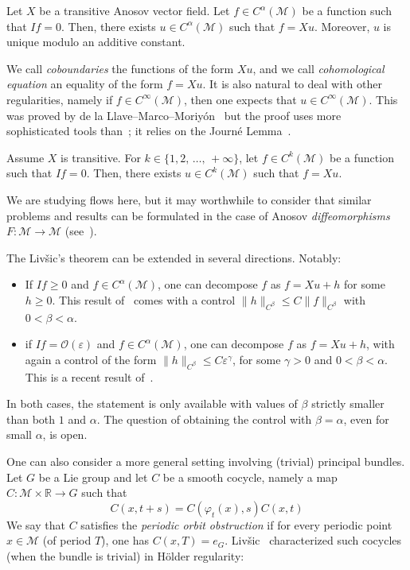 \documentclass[AHL,Unicode,longabstracts,published]{cedram}
\newcommand{\R}{\mathbb{R}}
\newcommand{\eps}{\varepsilon}
\newcommand{\mc}{\mathcal}
\newcommand{\M}{\mathcal{M}}
\begin{document}
\begin{theo}
Let $X$ be a transitive Anosov vector field. Let $f \in C^\alpha(\M)$ be a function such that $If = 0$. Then, there exists $u \in C^\alpha(\M)$ such that $f = Xu$. Moreover, $u$ is unique modulo an additive constant.
\end{theo}

We call \emph{coboundaries} the functions of the form $Xu$, and we call \emph{cohomological equation} an equality of the form $f =Xu$. It is also natural to deal with other regularities, namely if $f \in C^\infty(\M)$, then one expects that $u \in C^\infty(\M)$. This was proved by de la Llave--Marco--Moriyón~\cite{DeLaLlave-Marco-Moryon-86} but the proof uses more sophisticated tools than~\cite{Livsic-72}; it relies on the Journé Lemma~\cite{Journe-86}.

\begin{theo}\label{theorem:livsic-smooth}
Assume $X$ is transitive. For $k \in \{1,2,\,\dots,\,+\infty\}$, let $f \in C^k(\M)$ be a function such that $If=0$. Then, there exists $u \in C^k(\M)$ such that $f=Xu$.
\end{theo}

We are studying flows here, but it may worthwhile to consider that similar problems and results can be formulated in the case of Anosov \emph{diffeomorphisms} $F : \M \rightarrow \M$ (see~\cite{Hasselblatt-Katok-95}).

The Liv{\v s}ic's theorem can be extended in several directions. Notably:
\begin{itemize}
\item If $If \geq 0$ and $f \in C^\alpha(\M)$, one can decompose $f$ as $f = Xu + h$ for some $h \geq 0$. This result of~\cite{Lopes-Thieullen-05} comes with a control $\|h\|_{C^{\beta}} \leq C \|f\|_{C^\beta}$ with $0<\beta < \alpha$.
\item if $If = \mc{O}(\eps)$ and $f \in C^\alpha(\M)$, one can decompose $f$ as $f = Xu+h$, with again a control of the form $\|h\|_{C^\beta} \leq C \eps^\gamma$, for some $\gamma > 0$ and $0<\beta < \alpha$. This is a recent result of~\cite{Gouezel-Lefeuvre-19}.
\end{itemize}
In both cases, the statement is only available with values of $\beta$ strictly smaller than both $1$ and $\alpha$. The question of obtaining the control with $\beta = \alpha$, even for small $\alpha$, is open.

One can also consider a more general setting involving (trivial) principal bundles. Let $G$ be a Lie group and let $C$ be a smooth cocycle, namely a map $C : \mc{M} \times \R \rightarrow G$ such that
\[
C(x,t+s) = C(\varphi_t (x), s)C(x,t)
\]
We say that $C$ satisfies the \emph{periodic orbit obstruction} if for every periodic point $x \in \M$ (of period $T$), one has $C(x,T) = e_G$. Liv{\v s}ic~\cite{Livsic-72} characterized such cocycles (when the bundle is trivial) in H\"older regularity:
\end{document}

